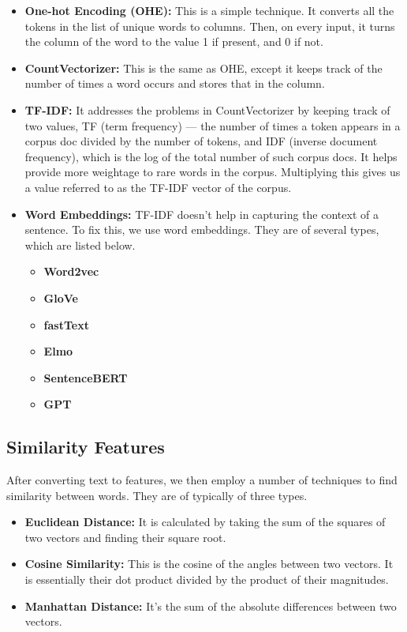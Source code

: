 \documentclass{article}
\begin{document}
\begin{itemize}
    \item{\textbf{One-hot Encoding (OHE):} This is a simple technique. It converts all the tokens in the list of unique words to columns. Then, on every input, it turns the column of the word to the value 1 if present, and 0 if not.}
    \item{\textbf{CountVectorizer:} This is the same as OHE, except it keeps track of the number of times a word occurs and stores that in the column.}
    \item{\textbf{TF-IDF:} It addresses the problems in CountVectorizer by keeping track of two values, TF (term frequency) — the number of times a token appears in a corpus doc divided by the number of tokens, and IDF (inverse document frequency), which is the log of the total number of such corpus docs. It helps provide more weightage to rare words in the corpus. Multiplying this gives us a value referred to as the TF-IDF vector of the corpus.}
    \item{\textbf{Word Embeddings:} TF-IDF doesn't help in capturing the context of a sentence. To fix this, we use word embeddings. They are of several types, which are listed below.}
    \begin{itemize}
			\item{\textbf{Word2vec}}
			\item{\textbf{GloVe}}
			\item{\textbf{fastText}}
			\item{\textbf{Elmo}}
			\item{\textbf{SentenceBERT}}
			\item{\textbf{GPT}}
    \end{itemize}
\end{itemize}

\subsection{Similarity Features}

After converting text to features, we then employ a number of techniques to find similarity between words. They are of typically of three types.

\begin{itemize}
    \item{\textbf{Euclidean Distance:} It is calculated by taking the sum of the squares of two vectors and finding their square root.}
    \item{\textbf{Cosine Similarity:} This is the cosine of the angles between two vectors. It is essentially their dot product divided by the product of their magnitudes.}
    \item{\textbf{Manhattan Distance:} It's the sum of the absolute differences between two vectors.}
\end{itemize}
\end{document}

